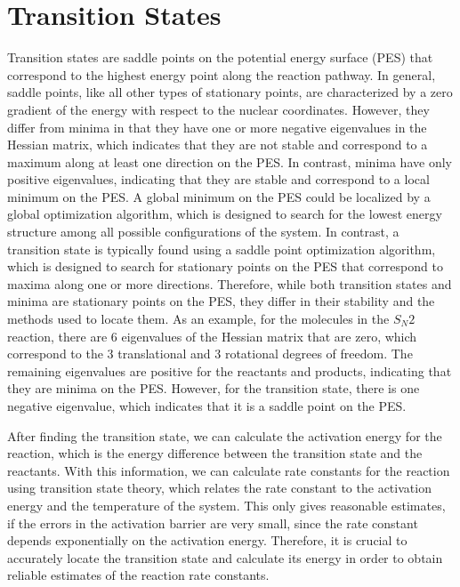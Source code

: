 \documentclass[a4paper,12pt]{scrartcl}
\begin{document}
\section{Transition States}

Transition states are saddle points on the potential energy surface (PES) that correspond to the highest energy point along the reaction pathway.
In general, saddle points, like all other types of stationary points, are characterized by a zero gradient of the energy with respect to the nuclear coordinates. However, they differ from minima in that they have one or more negative eigenvalues in the Hessian matrix, which indicates that they are not stable and correspond to a maximum along at least one direction on the PES. In contrast, minima have only positive eigenvalues, indicating that they are stable and correspond to a local minimum on the PES.
A global minimum on the PES could be localized by a global optimization algorithm, which is designed to search for the lowest energy structure among all possible configurations of the system. In contrast, a transition state is typically found using a saddle point optimization algorithm, which is designed to search for stationary points on the PES that correspond to maxima along one or more directions. Therefore, while both transition states and minima are stationary points on the PES, they differ in their stability and the methods used to locate them.
As an example, for the molecules in the $S_N 2$ reaction, there are 6 eigenvalues of the Hessian matrix that are zero, which correspond to the 3 translational and 3 rotational degrees of freedom. The remaining eigenvalues are positive for the reactants and products, indicating that they are minima on the PES. However, for the transition state, there is one negative eigenvalue, which indicates that it is a saddle point on the PES.

After finding the transition state, we can calculate the activation energy for the reaction, which is the energy difference between the transition state and the reactants. With this information, we can calculate rate constants for the reaction using transition state theory, which relates the rate constant to the activation energy and the temperature of the system.
This only gives reasonable estimates, if the errors in the activation barrier are very small, since the rate constant depends exponentially on the activation energy. Therefore, it is crucial to accurately locate the transition state and calculate its energy in order to obtain reliable estimates of the reaction rate constants.
\end{document}
